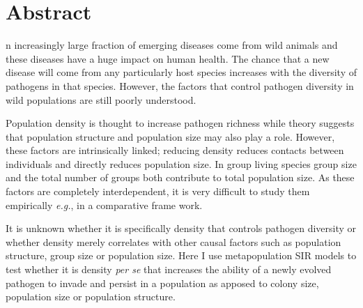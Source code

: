 










\section{Abstract}

n increasingly large fraction of emerging diseases come from wild animals and these diseases have a huge impact on human health.
The chance that a new disease will come from any particularly host species increases with the diversity of pathogens in that species.
However, the factors that control pathogen diversity in wild populations are still poorly understood.



Population density is thought to increase pathogen richness while theory suggests that population structure and population size may also play a role.
However, these factors are intrinsically linked; reducing density reduces contacts between individuals and directly reduces population size.
In group living species group size and the total number of groups both contribute to total population size. 
As these factors are completely interdependent, it is very difficult to study them empirically \emph{e.g.}, in a comparative frame work.



It is unknown whether it is specifically density that controls pathogen diversity or whether density merely correlates with other causal factors such as population structure, group size or population size.
Here I use metapopulation SIR models to test whether it is density \emph{per se} that increases the ability of a newly evolved pathogen to invade and persist in a population as apposed to colony size, population size or population structure.


